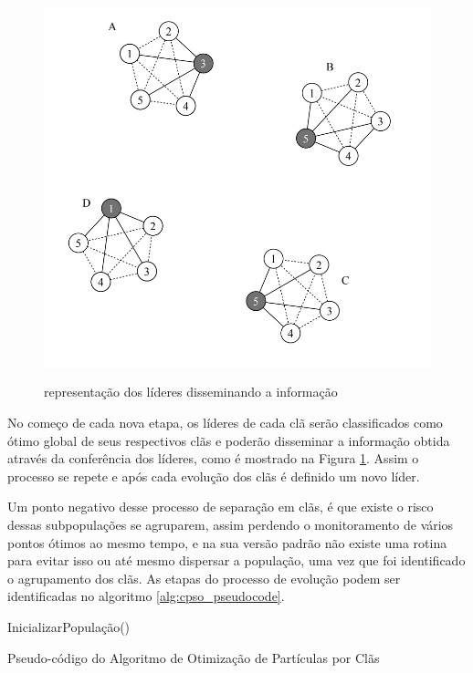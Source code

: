 \begin{figure}[!htb]
	\caption{representação dos líderes disseminando a informação}
	\centering
	\includegraphics[scale=0.6]{images/cpso_information_sharing.png}
	\label{fig:cpso_information_sharing}
\end{figure}

No começo de cada nova etapa, os líderes de cada clã serão classificados como ótimo global de seus respectivos clãs e poderão disseminar a informação obtida através da conferência dos líderes, como é mostrado na Figura \ref{fig:cpso_information_sharing}. Assim o processo se repete e após cada evolução dos clãs é definido um novo líder.

Um ponto negativo desse processo de separação em clãs, é que existe o risco dessas subpopulações se agruparem, assim perdendo o monitoramento de vários pontos ótimos ao mesmo tempo, e na sua versão padrão não existe uma rotina para evitar isso ou até mesmo dispersar a população, uma vez que foi identificado o agrupamento dos clãs. As etapas do processo de evolução podem ser identificadas no algoritmo \ref{alg:cpso_pseudocode}.

\begin{algorithm}
	\label{alg:cpso_pseudocode}
	InicializarPopulação()\;
	\caption{Pseudo-código do Algoritmo de Otimização de Partículas por Clãs}
\end{algorithm}

